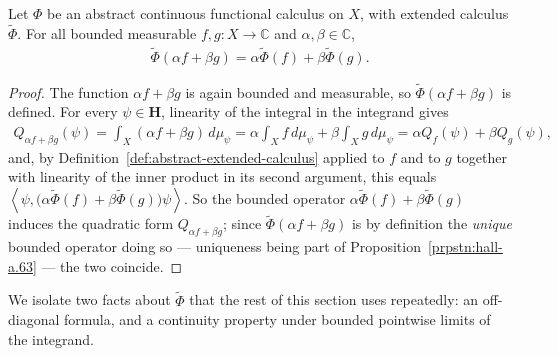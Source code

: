 \begin{lemma}
    \label{lmm:abstract-extended-linear}
    \leanok
    Let $\Phi$ be an abstract continuous functional calculus on $X$, with extended calculus $\widetilde\Phi$. For all bounded measurable $f,g : X \to \mathbb{C}$ and $\alpha,\beta \in \mathbb{C}$,
    \begin{align}
        \widetilde\Phi(\alpha f + \beta g) = \alpha\widetilde\Phi(f) + \beta\widetilde\Phi(g).
    \end{align}
\end{lemma}
\begin{proof}
    \leanok
The function $\alpha f + \beta g$ is again bounded and measurable, so $\widetilde\Phi(\alpha f + \beta g)$ is defined. For every $\psi \in \mathbf{H}$, linearity of the integral in the integrand gives
\begin{align}
    Q_{\alpha f+\beta g}(\psi) = \int_X (\alpha f + \beta g) \, d\mu_\psi = \alpha\int_X f\,d\mu_\psi + \beta\int_X g\,d\mu_\psi = \alpha Q_f(\psi) + \beta Q_g(\psi),
\end{align}
and, by Definition~\ref{def:abstract-extended-calculus} applied to $f$ and to $g$ together with linearity of the inner product in its second argument, this equals $\left< \psi, \big(\alpha\widetilde\Phi(f) + \beta\widetilde\Phi(g)\big)\psi \right>$. So the bounded operator $\alpha\widetilde\Phi(f)+\beta\widetilde\Phi(g)$ induces the quadratic form $Q_{\alpha f + \beta g}$; since $\widetilde\Phi(\alpha f+\beta g)$ is by definition the \textit{unique} bounded operator doing so — uniqueness being part of Proposition~\ref{prpstn:hall-a.63} — the two coincide.
\end{proof}

We isolate two facts about $\widetilde\Phi$ that the rest of this section uses repeatedly: an off-diagonal formula, and a continuity property under bounded pointwise limits of the integrand.

